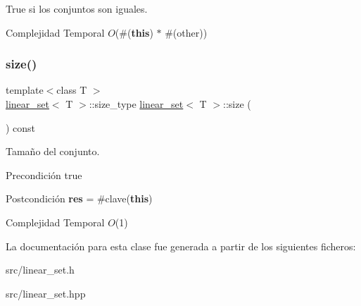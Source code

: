 True si los conjuntos son iguales. 


\begin{DoxyDescription}
\item[Complejidad Temporal]$O$(\#({\bfseries this}) $\ast$ \#(other))
\end{DoxyDescription}\mbox{\label{classlinear__set_aa20eaba8c492bb3b93c63384c0b55e58}} 
\subsubsection{\texorpdfstring{size()}{size()}}
{\footnotesize\ttfamily template$<$class T $>$ \\
\mbox{\hyperlink{classlinear__set}{linear\+\_\+set}}$<$ T $>$\+::size\+\_\+type \mbox{\hyperlink{classlinear__set}{linear\+\_\+set}}$<$ T $>$\+::size (\begin{DoxyParamCaption}{ }\end{DoxyParamCaption}) const}



Tamaño del conjunto. 

\begin{DoxyPrecond}{Precondición}
true 
\end{DoxyPrecond}
\begin{DoxyPostcond}{Postcondición}
{\bfseries res} = \#clave({\bfseries this})
\end{DoxyPostcond}

\begin{DoxyDescription}
\item[Complejidad Temporal]$O$(1)
\end{DoxyDescription}

La documentación para esta clase fue generada a partir de los siguientes ficheros\+:\begin{DoxyCompactItemize}
\item 
src/linear\+\_\+set.\+h\item 
src/linear\+\_\+set.\+hpp\end{DoxyCompactItemize}
